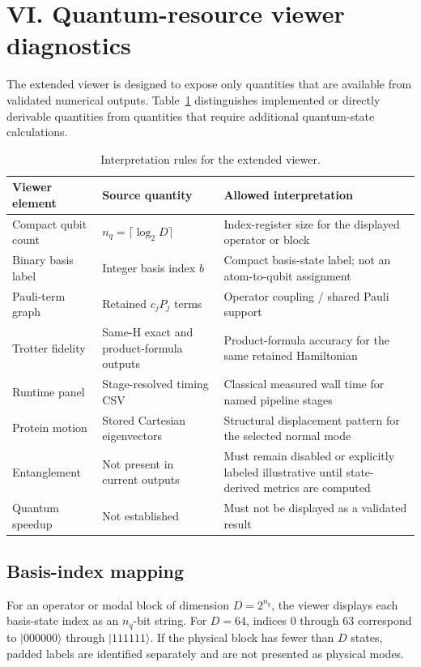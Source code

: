 \documentclass[10pt]{article}
\begin{document}
\section*{VI. Quantum-resource viewer diagnostics}

The extended viewer is designed to expose only quantities that are available from validated numerical outputs. Table~\ref{tab:viewer} distinguishes implemented or directly derivable quantities from quantities that require additional quantum-state calculations.

\begin{table}[h]
\centering
\caption{Interpretation rules for the extended viewer.}
\label{tab:viewer}
\small
\begin{tabularx}{\textwidth}{@{}p{}XX@{}}
\toprule
Viewer element & Source quantity & Allowed interpretation \\
\midrule
Compact qubit count & $n_q=\lceil\log_2 D\rceil$ & Index-register size for the displayed operator or block \\
Binary basis label & Integer basis index $b$ & Compact basis-state label; not an atom-to-qubit assignment \\
Pauli-term graph & Retained $c_jP_j$ terms & Operator coupling / shared Pauli support \\
Trotter fidelity & Same-H exact and product-formula outputs & Product-formula accuracy for the same retained Hamiltonian \\
Runtime panel & Stage-resolved timing CSV & Classical measured wall time for named pipeline stages \\
Protein motion & Stored Cartesian eigenvectors & Structural displacement pattern for the selected normal mode \\
Entanglement & Not present in current outputs & Must remain disabled or explicitly labeled illustrative until state-derived metrics are computed \\
Quantum speedup & Not established & Must not be displayed as a validated result \\
\bottomrule
\end{tabularx}
\end{table}

\subsection*{Basis-index mapping}
For an operator or modal block of dimension $D=2^{n_q}$, the viewer displays each basis-state index as an $n_q$-bit string. For $D=64$, indices $0$ through $63$ correspond to $|000000\rangle$ through $|111111\rangle$. If the physical block has fewer than $D$ states, padded labels are identified separately and are not presented as physical modes.
\end{document}
